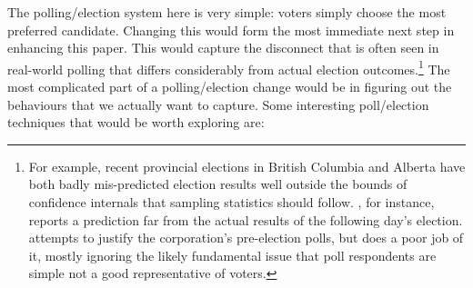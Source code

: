 \documentclass[12pt]{article}
\numberwithin{equation}{subsection}
\begin{document}
The polling/election system here is very simple: voters simply choose the most preferred
candidate.  Changing this would form the most immediate next step in enhancing this paper.
This would capture the disconnect that is often seen in real-world polling that differs
considerably from actual election outcomes.\footnote{
    For example, recent provincial elections in British Columbia and Alberta have both badly
    mis-predicted election results well outside the bounds of confidence internals that
    sampling statistics should follow.  \citet{ipsos:prebc}, for instance, reports a
    prediction far from the actual results of the following day's election.
    \citet{ipsos:postbc} attempts to justify the corporation's pre-election polls, but does a poor job of
    it, mostly ignoring the likely fundamental issue that poll respondents are simple not a
    good representative of voters.
}  The most complicated part of a polling/election change would be in figuring out the
behaviours that we actually want to capture.  Some interesting poll/election techniques that
would be worth exploring are:
\end{document}
